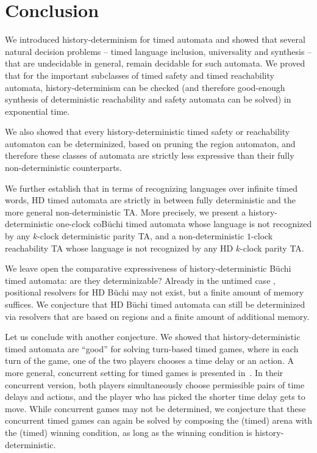 	
	
	\section{Conclusion}
	\label{sec_conclusion}
We introduced history-determinism for timed automata and showed that several natural decision problems
-- timed language inclusion, universality and synthesis --
that are undecidable in general,
remain decidable for such automata.
We proved that for the important subclasses of timed safety and timed reachability automata, history-determinism can be checked (and therefore good-enough synthesis of deterministic reachability and safety automata can be solved) in exponential time.

We also showed that every history-deterministic timed safety or reachability automaton can be determinized, based on pruning the region automaton, and therefore these classes of automata are strictly less expressive than their fully non-deterministic counterparts.

We further establish that in terms of recognizing languages over infinite timed words, HD timed automata are strictly in between fully deterministic and the more general non-deterministic TA. More precisely, we present a history-deterministic one-clock coB\"uchi timed automata whose language is not recognized by any $k$-clock deterministic parity TA,
and a non-deterministic $1$-clock reachability TA whose language is not recognized by any HD $k$-clock parity TA.

We leave open the comparative expressiveness of history-deterministic B\"uchi timed automata:
are they determinizable? Already in the untimed case \cite{RK19},
positional resolvers for HD B\"uchi may not exist, but a finite amount of memory suffices.
We conjecture that HD B\"uchi timed automata can still be determinized via resolvers that
are based on regions and a finite amount of additional memory.

Let us conclude with another conjecture.
We showed that history-deterministic timed automata are ``good'' for solving
turn-based timed games, where in each turn of the game, one of the two players
chooses a time delay or an action. 
A more general, concurrent setting for timed games is presented in~\cite{DFHM03}.
In their concurrent version, both players simultaneously choose permissible pairs
of time delays and actions, and the player who has picked the shorter time delay
gets to move.
While concurrent games may not be determined, we conjecture that these concurrent
timed games can again be solved by composing the (timed) arena with the (timed)
winning condition, as long as the winning condition is history-deterministic.

	
	
